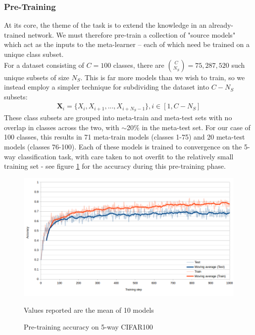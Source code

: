 \documentclass{report}
\begin{document}
\subsubsection{Pre-Training} \label{pre-training}
At its core, the theme of the task is to extend the knowledge in an already-trained network. We must therefore pre-train a collection of "source models" which act as the inputs to the meta-learner -- each of which need be trained on a unique class subset. \\
For a dataset consisting of $C=100$ classes, there are ${C\choose N_S} = 75,287,520$ such unique subsets of size $N_S$. This is far more models than we wish to train, so we instead employ a simpler technique for subdividing the dataset into $C-N_S$ subsets: 
\begin{align}
	\bm{X}_i = \lbrace X_i, X_{i+1}, ..., X_{i+N_S-1} \rbrace, i \in[1, C-N_S] 
\end{align}
These class subsets are grouped into meta-train and meta-test sets with no overlap in classes across the two, with $\sim$20\% in the meta-test set. For our case of 100 classes, this results in 71 meta-train models (classes 1-75) and 20 meta-test models (classes 76-100). Each of these models is trained to convergence on the 5-way classification task, with care taken to not overfit to the relatively small training set - see figure \ref{fig:pre-training-acc:1} for the accuracy during this pre-training phase. \\

\begin{figure}[h!]
	\centering
	\includegraphics[width=16cm]{pre-training-acc}
	\caption{Pre-training accuracy on 5-way CIFAR100}
	\label{fig:pre-training-acc:1}
	Values reported are the mean of 10 models
\end{figure}
\end{document}
